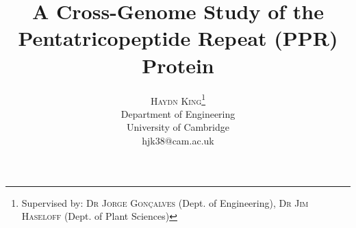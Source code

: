 \documentclass[twoside,a4paper]{article}
\title{\vspace{-15mm}\fontsize{24pt}{10pt}\selectfont\textbf{A Cross-Genome
Study of the Pentatricopeptide Repeat (PPR) Protein}} %
\author{
\large
\textsc{Haydn King}\thanks{Supervised by: \textsc{Dr Jorge Gon\c{c}alves} 
(Dept. of Engineering), \textsc{Dr Jim Haseloff} 
(Dept. of Plant Sciences)}\\[2mm] %
\normalsize Department of Engineering \\
\normalsize University of Cambridge \\ %
\normalsize hjk38@cam.ac.uk %
\vspace{-5mm}
}
\date{}
\begin{document}
\maketitle %

\thispagestyle{fancy} %


\begin{abstract}

\noindent \lipsum[1] %

\end{abstract}

\end{document}

